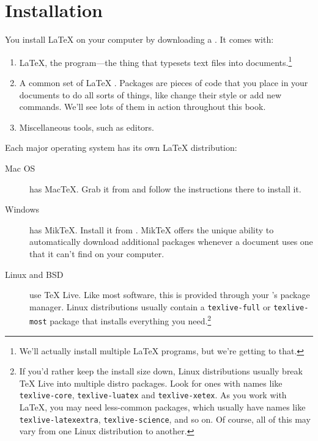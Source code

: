 \chapter{Installation}
\label{installation}

You install \LaTeX{} on your computer by downloading a .
It comes with:
\begin{enumerate}
\item \LaTeX, the program---the thing that typesets text files into
    documents.\footnote{We'll actually install multiple \LaTeX{} programs,
    but we're getting to that.}
\item A common set of \LaTeX{} .
    Packages are pieces of code that you place in your documents to
    do all sorts of things, like change their style or add new commands.
    We'll see lots of them in action throughout this book.
\item Miscellaneous tools, such as editors.
\end{enumerate}
Each major operating system has its own \LaTeX{} distribution:
\begin{description}
\item[Mac OS] has Mac\TeX. Grab it from 
    and follow the instructions there to install it.

\item[Windows] has Mik\TeX.
    Install it from .
    Mik\TeX{} offers the unique ability to automatically download
    additional packages whenever a document uses one that it can't find
    on your computer.

\item[Linux and BSD] use \TeX{} Live.
    Like most software, this is provided through your
    's package manager.
    Linux distributions usually contain a \texttt{texlive-\allowbreak full}
    or \texttt{texlive-\allowbreak most} package that installs everything
    you need.\punckern\footnote{%
    If you'd rather keep the install size down,
    Linux distributions usually break \TeX{} Live into multiple distro packages.
    Look for ones with names like
    \texttt{texlive-\allowbreak core}, \texttt{texlive-\allowbreak luatex}
    and \texttt{texlive-\allowbreak xetex}.
    As you work with \LaTeX, you may need less-common packages,
    which usually have names like \texttt{texlive-\allowbreak latexextra},
    \texttt{texlive-\allowbreak science}, and so on.
    Of course, all of this may vary from one Linux distribution to another.}
\end{description}

